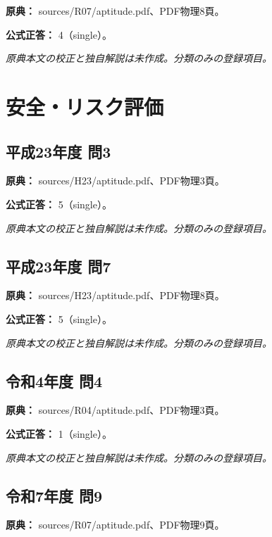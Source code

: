 \noindent\textbf{原典：} sources/R07/aptitude.pdf、PDF物理8頁。

\textbf{公式正答：} 4（single）。

\par\textit{原典本文の校正と独自解説は未作成。分類のみの登録項目。}

\section{安全・リスク評価}

\subsection{平成23年度 問3}
\label{q:h23-reg-apt-03}

\noindent\textbf{原典：} sources/H23/aptitude.pdf、PDF物理3頁。

\textbf{公式正答：} 5（single）。

\par\textit{原典本文の校正と独自解説は未作成。分類のみの登録項目。}

\subsection{平成23年度 問7}
\label{q:h23-reg-apt-07}

\noindent\textbf{原典：} sources/H23/aptitude.pdf、PDF物理8頁。

\textbf{公式正答：} 5（single）。

\par\textit{原典本文の校正と独自解説は未作成。分類のみの登録項目。}

\subsection{令和4年度 問4}
\label{q:r04-reg-apt-04}

\noindent\textbf{原典：} sources/R04/aptitude.pdf、PDF物理3頁。

\textbf{公式正答：} 1（single）。

\par\textit{原典本文の校正と独自解説は未作成。分類のみの登録項目。}

\subsection{令和7年度 問9}
\label{q:r07-reg-apt-09}

\noindent\textbf{原典：} sources/R07/aptitude.pdf、PDF物理9頁。


